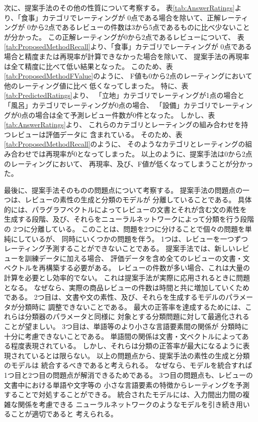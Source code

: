次に、提案手法のその他の性質について考察する。
%
表\ref{tab:AnswerRatings}より、「食事」カテゴリでレーティングが
0点である場合を除いて、正解レーティングが
0から2点であるレビューの件数は3から5点であるものに比べ少ないことが分かった。
この正解レーティングが0から2点であるレビューについて、
表\ref{tab:ProposedMethodRecall}より、「食事」カテゴリでレーティングが
0点である場合と精度または再現率が計算できなかった場合を除いて、
提案手法の再現率は全て精度に比べて低い結果となった。
このため、表\ref{tab:ProposedMethodFValue}のように、
F値も0から2点のレーティングにおいて他のレーティング値に比べ
低くなってしまった。
%
特に、表\ref{tab:PredictedRatings}より、
「立地」カテゴリでレーティングが1点の場合と
「風呂」カテゴリでレーティングが0点の場合、
「設備」カテゴリでレーティングが0点の場合は全て予測レビュー件数が0件となった。
しかし、表\ref{tab:AnswerRatings}より、
これらのカテゴリとレーティングの組み合わせを持つレビューは評価データに
含まれている。
そのため、表\ref{tab:ProposedMethodRecall}のように、
そのようなカテゴリとレーティングの組み合わせでは再現率が0となってしまった。
%
以上のように、提案手法は0から2点のレーティングにおいて、
再現率、及び、F値が低くなってしまうことが分かった。

最後に、提案手法そのものの問題点について考察する。
提案手法の問題点の一つは、レビューの素性の生成と分類のモデルが
分離していることである。
具体的には、パラグラフベクトルによってレビューの文書とそれが含む文の素性を
生成する段階、及び、それらをニューラルネットワークによって分類を行う段階の
2つに分離している。
このことは、問題を2つに分けることで個々の問題を単純にしているが、
同時にいくつかの問題を伴う。
1つは、レビューを一つずつレーティング予測することができないことである。
提案手法では、新しいレビューを訓練データに加える場合、
評価データを含め全てのレビューの文書・文ベクトルを再構築する必要がある。
レビューの件数が多い場合、これは大量の計算を必要とし効率的でない。
これは提案手法が実際に応用されるときに問題となる。
なぜなら、実際の商品レビューの件数は時間と共に増加していくためである。
2つ目は、文書や文の素性、及び、それらを生成するモデルのパラメータが分類時に
調整できないことである。
最大の正答率を達成するためには、これらは分類器のパラメータと同様に
対象とする分類問題に対して最適化されることが望ましい。
3つ目は、単語等のより小さな言語要素間の関係が
分類時に十分に考慮できないことである。
単語間の関係は文書・文ベクトルによってある程度表現されている。
しかし、それらは分類の正答率が最大になるように表現されているとは限らない。
以上の問題点から、提案手法の素性の生成と分類のモデルは
統合するべきであると考えられる。
なぜなら、モデルを統合すれば1つ目と2つ目の問題点が解消できるためである。
3つ目の問題点も、レビューの文書中における単語や文字等の
小さな言語要素の特徴からレーティングを予測することで対処することができる。
統合されたモデルには、入力間出力間の複雑な関係を考慮できる
ニューラルネットワークのようなモデルを引き続き用いることが適切であると
考えられる。
